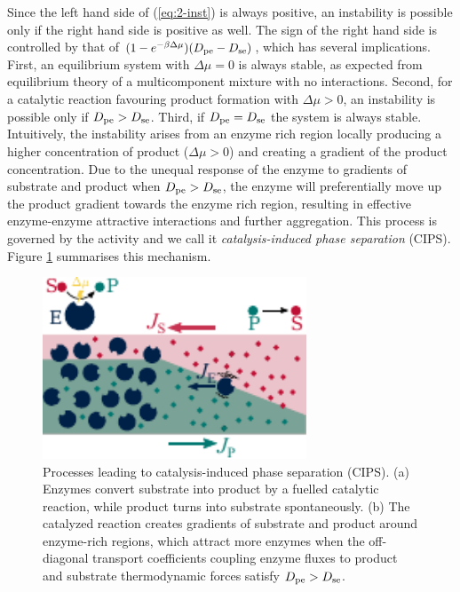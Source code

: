 Since the left hand side of (\ref{eq:2-inst}) is always positive, an instability is possible only if the right hand side is positive as well. The sign of the right hand side is controlled by that of $(1-e^{-\beta\Delta \mu})(D_{\mathrm{pe}}-D_{\mathrm{se}})$, which has several implications. First, an equilibrium system with $\Delta\mu=0$ is always stable, as expected from equilibrium theory of a multicomponent mixture with no interactions. Second, for a catalytic reaction favouring product formation with $\Delta \mu>0$, an instability is possible only if $D_{\mathrm{pe}}>D_{\mathrm{se}}$. Third, if $D_{\mathrm{pe}}=D_{\mathrm{se}}$ the system is always stable. Intuitively, the instability arises from an enzyme rich region locally producing a higher concentration of product ($\Delta \mu > 0$) and creating a gradient of the product concentration. Due to the unequal response of the enzyme to gradients of substrate and product when $D_{\mathrm{pe}}>D_{\mathrm{se}}$, the enzyme will preferentially move up the product gradient towards the enzyme rich region, resulting in effective enzyme-enzyme attractive interactions and further aggregation. This process is governed by the activity and we call it \textit{catalysis-induced phase separation} (CIPS). Figure \ref{fig:cips_scheme} summarises this mechanism.

\begin{figure}
    \centering
    \includegraphics[width=0.7\textwidth]{figures/cips_scheme.pdf}
    \caption{Processes leading to catalysis-induced phase separation (CIPS). 
		(a) Enzymes convert substrate into product by a fuelled catalytic reaction, while product turns into substrate spontaneously. (b) The catalyzed reaction creates gradients of substrate and product around enzyme-rich regions, which attract more enzymes when the off-diagonal transport coefficients coupling enzyme fluxes to product and substrate thermodynamic forces satisfy $D_{\mathrm{pe}}>D_{\mathrm{se}}$.}
    \label{fig:cips_scheme}
\end{figure}

